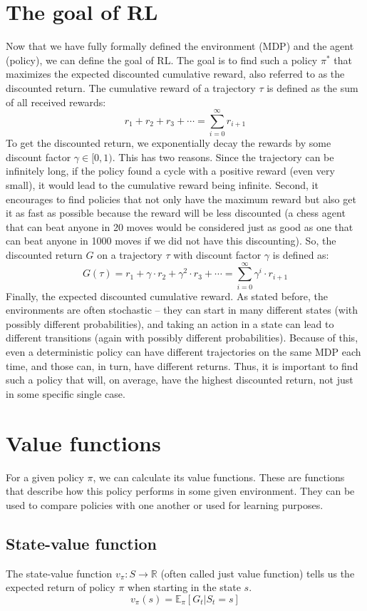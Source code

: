 \documentclass[
  digital,     %
  oneside,     %
  nosansbold,  %
  nocolorbold, %
  lof,         %
  lot,         %
]{fithesis4}
\begin{document}
\section{The goal of RL}
\label{section:goal}
Now that we have fully formally defined the environment (MDP) and the agent (policy), we can define the goal of RL. The goal is to find such a policy $\pi^*$ that maximizes the expected discounted cumulative reward, also referred to as the discounted return. The cumulative reward of a trajectory $\tau$ is defined as the sum of all received rewards:
\[
r_1+r_2+r_3+\dotsb = \sum_{i=0}^{\infty} r_{i+1}
\]
To get the discounted return, we exponentially decay the rewards by some discount factor $\gamma \in [0,1)$. This has two reasons. Since the trajectory can be infinitely long, if the policy found a cycle with a positive reward (even very small), it would lead to the cumulative reward being infinite. Second, it encourages to find policies that not only have the maximum reward but also get it as fast as possible because the reward will be less discounted (a chess agent that can beat anyone in 20 moves would be considered just as good as one that can beat anyone in 1000 moves if we did not have this discounting). So, the discounted return $G$ on a trajectory $\tau$ with discount factor $\gamma$ is defined as:
\[
G(\tau)=r_1+\gamma \cdot r_2+ \gamma^2 \cdot r_3+\dotsb = \sum_{i=0}^{\infty} \gamma^i\cdot r_{i+1}
\]
Finally, the expected discounted cumulative reward. As stated before, the environments are often stochastic -- they can start in many different states (with possibly different probabilities), and taking an action in a state can lead to different transitions (again with possibly different probabilities). Because of this, even a deterministic policy can have different trajectories on the same MDP each time, and those can, in turn, have different returns. Thus, it is important to find such a policy that will, on average, have the highest discounted return, not just in some specific single case.

\section{Value functions}

For a given policy $\pi$, we can calculate its value functions. These are functions that describe how this policy performs in some given environment. They can be used to compare policies with one another or used for learning purposes.

\subsection{State-value function}
\label{subsec:state_value_func}
The state-value function $v_\pi\colon S\to \mathbb{R}$ (often called just value function) tells us the expected return of policy $\pi$ when starting in the state $s$.
\[
v_\pi(s) = \mathbb{E}_\pi [G_t|S_t=s]
\]
\end{document}
